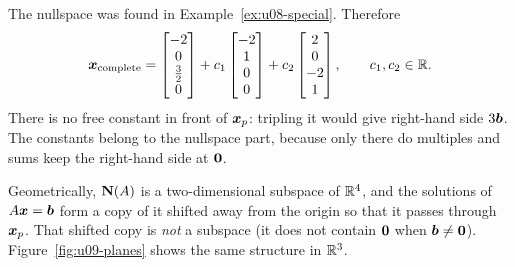 \begin{example}[All solutions for \texorpdfstring{\(\vb{b}=(1,5,6)\)}{b = (1,5,6)}]\label{ex:u09-complete}
The nullspace was found in Example~\ref{ex:u08-special}. Therefore
\[
\boldsymbol{x}_{\text{complete}}=
\begin{bmatrix}-2\\0\\\tfrac32\\0\end{bmatrix}
+c_1\begin{bmatrix}-2\\1\\0\\0\end{bmatrix}
+c_2\begin{bmatrix}2\\0\\-2\\1\end{bmatrix},\qquad c_1,c_2\in\mathbb{R}.
\]
There is no free constant in front of $\boldsymbol{x}_p$: tripling it would give right-hand side $3\boldsymbol{b}$.
The constants belong to the nullspace part, because only there do multiples and sums keep the
right-hand side at $\boldsymbol{0}$.
\end{example}

Geometrically, $\mathbf{N}(A)$ is a two-dimensional subspace of $\mathbb{R}^4$, and the solutions of
$A\boldsymbol{x}=\boldsymbol{b}$ form a copy of it shifted away from the origin so that it passes through
$\boldsymbol{x}_p$. That shifted copy is \emph{not} a subspace (it does not contain $\boldsymbol{0}$ when
$\boldsymbol{b}\neq\boldsymbol{0}$). Figure~\ref{fig:u09-planes} shows the same structure in $\mathbb{R}^3$.

